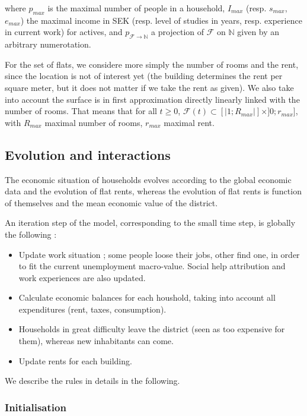 \documentclass[english]{article}
\begin{document}
where $p_{max}$ is the maximal number of people in a household, $I_{max}$
(resp. $s_{max}$, $e_{max}$) the maximal income in SEK (resp. level
of studies in years, resp. experience in current work) for actives,
and $p_{\mathcal{F}\rightarrow\mathbb{N}}$ a projection of $\mathcal{F}$
on $\mathbb{N}$ given by an arbitrary numerotation.

For the set of flats, we considere more simply the number of rooms
and the rent, since the location is not of interest yet (the building
determines the rent per square meter, but it does not matter if we take
the rent as given). We also take into account the surface is in first approximation
directly linearly linked with the number of rooms. That means that
for all $t\geq0$, $\mathcal{F}(t)\subset\left[\left|1;R_{max}\right|\right]\times]0;r_{max}]$,
with $R_{max}$ maximal number of rooms, $r_{max}$ maximal rent.


\subsection{Evolution and interactions}

The economic situation of households evolves according to the global
economic data and the evolution of flat rents, whereas the evolution
of flat rents is function of themselves and the mean economic value
of the district.

An iteration step of the model, corresponding to the small time step,
is globally the following :
\begin{itemize}
\item Update work situation ; some people loose their jobs, other find one,
in order to fit the current unemployment macro-value. Social help
attribution and work experiences are also updated.
\item Calculate economic balances for each houshold, taking into account
all expenditures (rent, taxes, consumption).
\item Households in great difficulty leave the district (seen as too expensive
for them), whereas new inhabitants can come.
\item Update rents for each building.
\end{itemize}
We describe the rules in details in the following.


\subsubsection{Initialisation}
\end{document}
